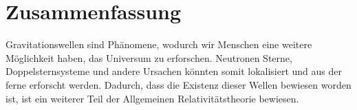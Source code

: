 
\chapter{Zusammenfassung}
Gravitationswellen sind Phänomene, wodurch wir Menschen eine weitere Möglichkeit haben, das Universum zu erforschen. Neutronen Sterne, Doppelsternsysteme und andere Ursachen könnten somit lokalisiert und aus der ferne erforscht werden. Dadurch, dass die Existenz dieser Wellen bewiesen worden ist, ist ein weiterer Teil der Allgemeinen Relativitätstheorie bewiesen. 